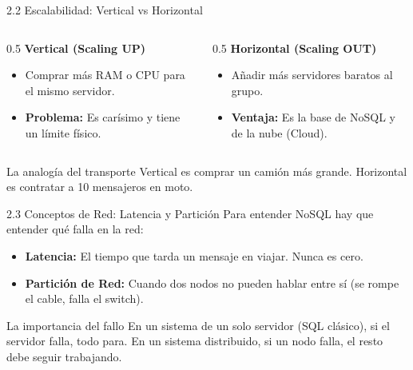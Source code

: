 \begin{frame}{2.2 Escalabilidad: Vertical vs Horizontal}
    \begin{columns}
        \begin{column}{0.5\textwidth}
            \textbf{Vertical (Scaling UP)}
            \begin{itemize}
                \item Comprar más RAM o CPU para el mismo servidor.
                \item \textbf{Problema:} Es carísimo y tiene un límite físico.
            \end{itemize}
        \end{column}
        \begin{column}{0.5\textwidth}
            \textbf{Horizontal (Scaling OUT)}
            \begin{itemize}
                \item Añadir más servidores baratos al grupo.
                \item \textbf{Ventaja:} Es la base de NoSQL y de la nube (Cloud).
            \end{itemize}
        \end{column}
    \end{columns}
    \begin{exampleblock}{La analogía del transporte}
        Vertical es comprar un camión más grande. Horizontal es contratar a 10 mensajeros en moto.
    \end{exampleblock}
\end{frame}

\begin{frame}{2.3 Conceptos de Red: Latencia y Partición}
    Para entender NoSQL hay que entender qué falla en la red:
    \begin{itemize}
        \item \textbf{Latencia:} El tiempo que tarda un mensaje en viajar. Nunca es cero.
        \item \textbf{Partición de Red:} Cuando dos nodos no pueden hablar entre sí (se rompe el cable, falla el switch).
    \end{itemize}
    \begin{alertblock}{La importancia del fallo}
        En un sistema de un solo servidor (SQL clásico), si el servidor falla, todo para. En un sistema distribuido, si un nodo falla, el resto debe seguir trabajando.
    \end{alertblock}
\end{frame}

